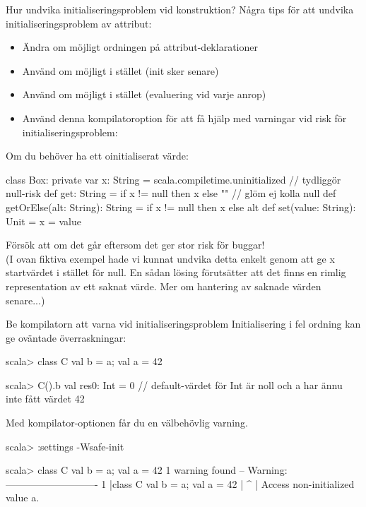 \begin{Slide}{Hur undvika initialiseringsproblem vid konstruktion?}
\SlideFontSmall
Några tips för att undvika initialiseringsproblem av attribut:
\begin{itemize}
  \item Ändra om möjligt ordningen på attribut-deklarationer
  \item Använd om möjligt i stället  (init sker senare)
  \item Använd om möjligt i stället  (evaluering vid varje anrop)
  \item Använd denna kompilatoroption för att få hjälp med varningar vid risk för initialiseringsproblem: 
\end{itemize}
\pause
Om du  behöver ha ett oinitialiserat värde:
\begin{Code}
class Box:
  private var x: String = scala.compiletime.uninitialized // tydliggör null-risk
  def get: String = if x != null then x else ""           // glöm ej kolla null
  def getOrElse(alt: String): String = if x != null then x else alt  
  def set(value: String): Unit = x = value
\end{Code}
Försök att   om det går eftersom det ger stor risk för buggar!\\
{\SlideFontTiny (I ovan fiktiva exempel hade vi kunnat undvika detta enkelt genom att ge x startvärdet  i stället för null. En sådan lösing förutsätter att det finns en rimlig representation av ett saknat värde. Mer om hantering av saknade värden senare...)}

\end{Slide}

\begin{Slide}{Be kompilatorn att varna vid initialiseringsproblem}
\SlideFontSmall
Initialisering i fel ordning kan ge oväntade överraskningar:
\begin{REPLsmall}
scala> class C { val b = a; val a = 42 }

scala> C().b
val res0: Int = 0  // default-värdet för Int är noll och a har ännu inte fått värdet 42
\end{REPLsmall}
Med kompilator-optionen  får du en välbehövlig varning.
\begin{REPLsmall}
scala> :settings -Wsafe-init

scala> class C { val b = a; val a = 42 }
1 warning found
-- Warning: ----------------------------
1 |class C { val b = a; val a = 42 }
  |                         ^
  |                         Access non-initialized value a.
\end{REPLsmall}
\end{Slide}

